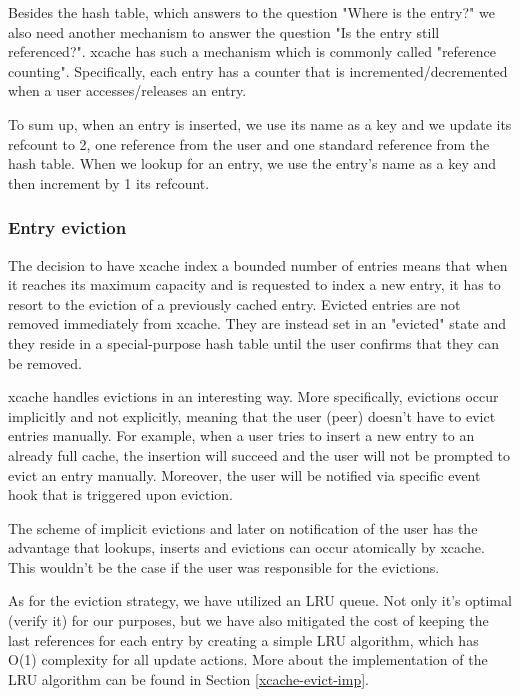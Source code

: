 Besides the hash table, which answers to the question "Where is the entry?" we 
also need another mechanism to answer the question "Is the entry still 
referenced?". xcache has such a mechanism which is commonly called "reference 
counting". Specifically, each entry has a counter that is 
incremented/decremented when a user accesses/releases an entry.

To sum up, when an entry is inserted, we use its name as a key and we update 
its refcount to 2, one reference from the user and one standard reference from 
the hash table. When we lookup for an entry, we use the entry's name as a key 
and then increment by 1 its refcount. 

\subsubsection{Entry eviction}\label{xcache-eviction-design}

The decision to have xcache index a bounded number of entries means that when 
it reaches its maximum capacity and is requested to index a new entry, it has 
to resort to the eviction of a previously cached entry. Evicted entries are not 
removed immediately from xcache. They are instead set in an "evicted" state and 
they reside in a special-purpose hash table until the user confirms that they 
can be removed. 

xcache handles evictions in an interesting way. More specifically, evictions 
occur implicitly and not explicitly, meaning that the user (peer) doesn't have 
to evict entries manually. For example, when a user tries to insert a new entry 
to an already full cache, the insertion will succeed and the user will not be 
prompted to evict an entry manually. Moreover, the user will be notified via 
specific event hook that is triggered upon eviction.

The scheme of implicit evictions and later on notification of the user has the 
advantage that lookups, inserts and evictions can occur atomically by xcache.  
This wouldn't be the case if the user was responsible for the evictions.

As for the eviction strategy, we have utilized an LRU queue. Not only it's 
optimal (\fixme verify it) for our purposes, but we have also mitigated the 
cost of keeping the last references for each entry by creating a simple LRU 
algorithm, which has O(1) complexity for all update actions. More about the 
implementation of the LRU algorithm can be found in Section 
\ref{xcache-evict-imp}.

